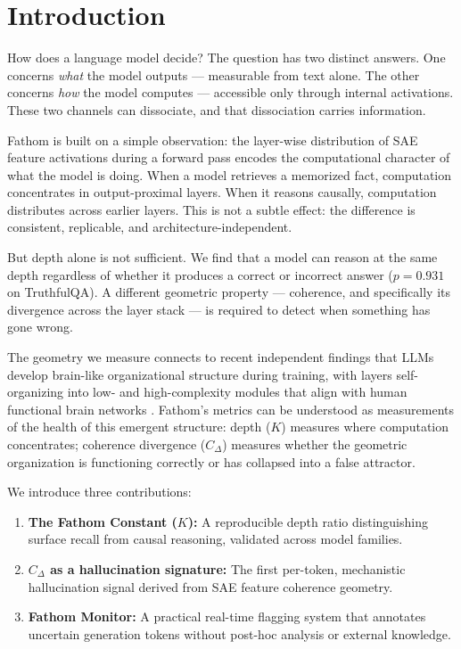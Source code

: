 \documentclass[10pt]{article}
\begin{document}
\section{Introduction}

How does a language model decide? The question has two distinct answers. One concerns \textit{what} the model outputs --- measurable from text alone. The other concerns \textit{how} the model computes --- accessible only through internal activations. These two channels can dissociate, and that dissociation carries information.

Fathom is built on a simple observation: the layer-wise distribution of SAE feature activations during a forward pass encodes the computational character of what the model is doing. When a model retrieves a memorized fact, computation concentrates in output-proximal layers. When it reasons causally, computation distributes across earlier layers. This is not a subtle effect: the difference is consistent, replicable, and architecture-independent.

But depth alone is not sufficient. We find that a model can reason at the same depth regardless of whether it produces a correct or incorrect answer ($p = 0.931$ on TruthfulQA). A different geometric property --- coherence, and specifically its divergence across the layer stack --- is required to detect when something has gone wrong.

The geometry we measure connects to recent independent findings that LLMs develop brain-like organizational structure during training, with layers self-organizing into low- and high-complexity modules that align with human functional brain networks \citep{ma2026, wang2024}. Fathom's metrics can be understood as measurements of the health of this emergent structure: depth ($K$) measures where computation concentrates; coherence divergence ($C_{\Delta}$) measures whether the geometric organization is functioning correctly or has collapsed into a false attractor.

We introduce three contributions:
\begin{enumerate}
    \item \textbf{The Fathom Constant ($K$):} A reproducible depth ratio distinguishing surface recall from causal reasoning, validated across model families.
    \item \textbf{$C_{\Delta}$ as a hallucination signature:} The first per-token, mechanistic hallucination signal derived from SAE feature coherence geometry.
    \item \textbf{Fathom Monitor:} A practical real-time flagging system that annotates uncertain generation tokens without post-hoc analysis or external knowledge.
\end{enumerate}
\end{document}
